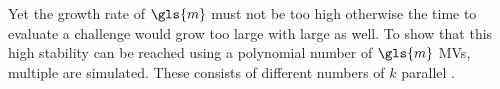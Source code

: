 Yet the growth rate of $\gls{m}$ must not be too high otherwise the time to evaluate a challenge would grow too large with large \xpufs as well. %
To show that this high stability can be reached using a polynomial number of $\gls{m}$ \acp{MV}, multiple \mxpufs are simulated.
These \mxpufs consists of different numbers of $k$ parallel \mpufs.


